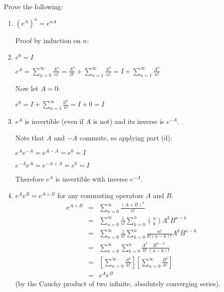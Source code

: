 \documentclass[letterpaper,12pt,fleqn]{article}
\begin{document}
Prove the following:
\begin{enumerate}[label=(\alph*)]
\item $(e^A)^n=e^{nA}$

  Proof by induction on $n$:
  
\item $e^0=I$

  $e^A=\sum_{n=0}^{\infty}\frac{A^n}{n!}=
  \frac{A^0}{0!}+\sum_{n=1}^{\infty}\frac{A^n}{n!}=
  I+\sum_{n=1}^{\infty}\frac{A^n}{n!}$

  Now let $A=0$:

  $e^0=I+\sum_{n=1}^{\infty}\frac{0^n}{n!}=I+0=I$
  
\item $e^A$ is invertible (even if $A$ is not) and its inverse is $e^{-A}$.

  Note that $A$ and $-A$ commute, so applying part (d):

  $e^Ae^{-A}=e^{A-A}=e^0=I$

  $e^{-A}e^A=e^{-A+A}=e^0=I$

  Therefore $e^A$ is invertible with inverse $e^{-A}$.
  
\item $e^Ae^B=e^{A+B}$ for any commuting operators $A$ and $B$.
  \begin{eqnarray*}
    e^{A+B} &=& \sum_{n=0}^{\infty}\frac{(A+B)^n}{n!} \\
    &=& \sum_{n=0}^{\infty}\frac{1}{n!}\sum_{k=0}^n\binom{n}{k}A^kB^{n-k} \\
    &=& \sum_{n=0}^{\infty}\frac{1}{n!}\sum_{k=0}^n
    \frac{n!}{k!(n-k)!}A^kB^{n-k} \\
    &=& \sum_{n=0}^{\infty}\sum_{k=0}^n\frac{A^k}{k!}\frac{B^{n-k}}{(n-k)!} \\
    &=& \left[\sum_{n=0}^{\infty}\frac{A^k}{k!}\right]
    \left[\sum_{n=0}^{\infty}\frac{B^k}{k!}\right] \\
    &=& e^Ae^B
  \end{eqnarray*}
  (by the Cauchy product of two infinite, absolutely converging series).
    

\end{enumerate}
\end{document}
